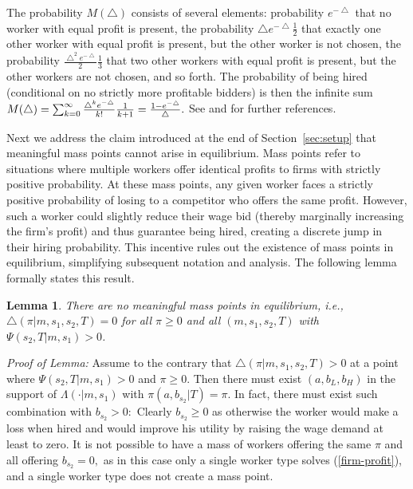 \documentclass[12pt]{article}
\newtheorem*{lemma*}{Lemma}
\begin{document}
The probability $M(\bigtriangleup )$ consists of several elements:
probability $e^{-\bigtriangleup }$ that no worker with equal profit is
present, the probability $\bigtriangleup e^{-\bigtriangleup }\frac{1}{2}$
that exactly one other worker with equal profit is present, but the other
worker is not chosen, the probability $\frac{\bigtriangleup
^{2}e^{-\bigtriangleup }}{2}\frac{1}{3}$ that two other workers with equal
profit is present, but the other workers are not chosen, and so forth. The probability
of being hired (conditional on no strictly more profitable bidders) is then
the infinite sum $M(\bigtriangleup )=\sum_{k=0}^{\infty }\frac{\bigtriangleup
^{k}e^{-\bigtriangleup }}{k!}\frac{1}{k+1}=\frac{1-e^{-\bigtriangleup }}{%
\bigtriangleup }.$
See \cite{burdett_etal2001} and \cite{wright_etal2021} for further references.

\bigskip

Next we address the claim introduced at the end of Section~\ref{sec:setup} that meaningful mass points cannot arise in equilibrium.
Mass points refer to situations where multiple workers offer identical profits to firms with strictly positive probability.
At these mass points, any given worker faces a strictly positive probability of losing to a competitor who offers the same profit.
However, such a worker could slightly reduce their wage bid (thereby marginally increasing the firm's profit) and thus guarantee being hired, creating a discrete jump in their hiring probability.
This incentive rules out the existence of mass points in equilibrium, simplifying subsequent notation and analysis.
The following lemma formally states this result.

\begin{lemma*}
\label{no-mass-point-lemma}There are no meaningful mass points in
equilibrium, i.e., $\bigtriangleup (\pi |m,s_{1},s_{2},T)=0$ for all $\pi
\geq 0$ and all $(m,s_{1},s_{2},T)$ with $\Psi (s_{2},T|m,s_{1})>0$.
\end{lemma*}

\textit{Proof of Lemma:} 
Assume to the contrary that $\bigtriangleup (\pi |m,s_{1},s_{2},T)>0$ at a point where $\Psi
(s_{2},T|m,s_{1})>0$ and $\pi \geq 0$. Then there must exist $%
(a,b_{L},b_{H}) $ in the support of $\Lambda (\cdot |m,s_{1})$ with $\pi
(a,b_{s_{2}}|T)=\pi .$ In fact, there must exist such combination with $%
b_{s_{2}}>0:$ Clearly $b_{s_{2}}\geq 0$ as otherwise the worker would make a
loss when hired and would improve his utility by raising the wage demand at
least to zero. It is not possible to have a mass of workers offering the
same $\pi $ and all offering $b_{s_{2}}=0,$ as in this case only a single
worker type solves (\ref{firm-profit}), and a single worker type does not
create a mass point.
\end{document}
